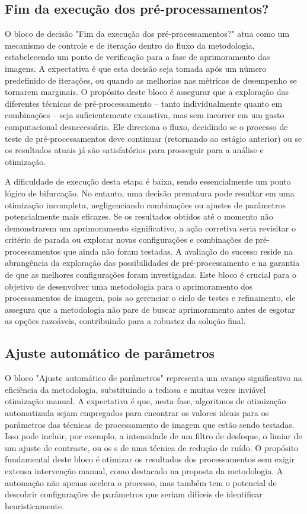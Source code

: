 \subsection{Fim da execução dos pré-processamentos?}
O bloco de decisão "Fim da execução dos pré-processamentos?" atua como um mecanismo de controle e de iteração dentro do fluxo da metodologia, estabelecendo um ponto de verificação para a fase de aprimoramento das imagens. A expectativa é que esta decisão seja tomada após um número predefinido de iterações, ou quando as melhorias nas métricas de desempenho se tornarem marginais. O propósito deste bloco é assegurar que a exploração das diferentes técnicas de pré-processamento -- tanto individualmente quanto em combinações -- seja suficientemente exaustiva, mas sem incorrer em um gasto computacional desnecessário. Ele direciona o fluxo, decidindo se o processo de teste de pré-processamentos deve continuar (retornando ao estágio anterior) ou se os resultados atuais já são satisfatórios para prosseguir para a análise e otimização.

A dificuldade de execução desta etapa é baixa, sendo essencialmente um ponto lógico de bifurcação. No entanto, uma decisão prematura pode resultar em uma otimização incompleta, negligenciando combinações ou ajustes de parâmetros potencialmente mais eficazes. Se os resultados obtidos até o momento não demonstrarem um aprimoramento significativo, a ação corretiva seria revisitar o critério de parada ou explorar novas configurações e combinações de pré-processamentos que ainda não foram testadas. A avaliação do sucesso reside na abrangência da exploração das possibilidades de pré-processamento e na garantia de que as melhores configurações foram investigadas. Este bloco é crucial para o objetivo de desenvolver uma metodologia para o aprimoramento dos processamentos de imagem, pois ao gerenciar o ciclo de testes e refinamento, ele assegura que a metodologia não pare de buscar aprimoramento antes de esgotar as opções razoáveis, contribuindo para a robustez da solução final.

\subsection{Ajuste automático de parâmetros}
O bloco "Ajuste automático de parâmetros" representa um avanço significativo na eficiência da metodologia, substituindo a tediosa e muitas vezes inviável otimização manual. A expectativa é que, nesta fase, algoritmos de otimização automatizada sejam empregados para encontrar os valores ideais para os parâmetros das técnicas de processamento de imagem que estão sendo testadas. Isso pode incluir, por exemplo, a intensidade de um filtro de desfoque, o limiar de um ajuste de contraste, ou os s de uma técnica de redução de ruído. O propósito fundamental deste bloco é otimizar os resultados dos processamentos sem exigir extensa intervenção manual, como destacado na proposta da metodologia. A automação não apenas acelera o processo, mas também tem o potencial de descobrir configurações de parâmetros que seriam difíceis de identificar heuristicamente.

